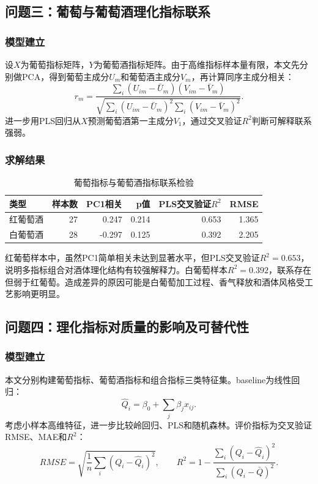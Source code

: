 \documentclass[UTF8,a4paper,12pt]{ctexart}
\begin{document}
\subsection{问题三：葡萄与葡萄酒理化指标联系}
\subsubsection{模型建立}
设$X$为葡萄指标矩阵，$Y$为葡萄酒指标矩阵。由于高维指标样本量有限，本文先分别做PCA，得到葡萄主成分$U_m$和葡萄酒主成分$V_m$，再计算同序主成分相关：
\begin{equation}r_m=\frac{\sum_i(U_{im}-\bar U_m)(V_{im}-\bar V_m)}{\sqrt{\sum_i(U_{im}-\bar U_m)^2\sum_i(V_{im}-\bar V_m)^2}}.\end{equation}
进一步用PLS回归从$X$预测葡萄酒第一主成分$V_1$，通过交叉验证$R^2$判断可解释联系强弱。
\subsubsection{求解结果}
\begin{table}[H]\centering\caption{葡萄指标与葡萄酒指标联系检验}\begin{tabular}{lrrrrr}\toprule 类型 & 样本数 & PC1相关 & p值 & PLS交叉验证$R^2$ & RMSE\\\midrule
红葡萄酒 & 27 & 0.247 & 0.214 & 0.653 & 1.365 \\
白葡萄酒 & 28 & -0.297 & 0.125 & 0.392 & 2.205 \\
\bottomrule\end{tabular}\end{table}
红葡萄样本中，虽然PC1简单相关未达到显著水平，但PLS交叉验证$R^2=0.653$，说明多指标组合对酒体理化结构有较强解释力。白葡萄样本$R^2=0.392$，联系存在但弱于红葡萄。造成差异的原因可能是白葡萄加工过程、香气释放和酒体风格受工艺影响更明显。
\subsection{问题四：理化指标对质量的影响及可替代性}
\subsubsection{模型建立}
本文分别构建葡萄指标、葡萄酒指标和组合指标三类特征集。baseline为线性回归：
\begin{equation}\hat Q_i=\beta_0+\sum_j\beta_jx_{ij}.\end{equation}
考虑小样本高维特征，进一步比较岭回归、PLS和随机森林。评价指标为交叉验证RMSE、MAE和$R^2$：
\begin{equation}RMSE=\sqrt{\frac1n\sum_i(Q_i-\hat Q_i)^2},\qquad R^2=1-\frac{\sum_i(Q_i-\hat Q_i)^2}{\sum_i(Q_i-\bar Q)^2}.\end{equation}
\end{document}

